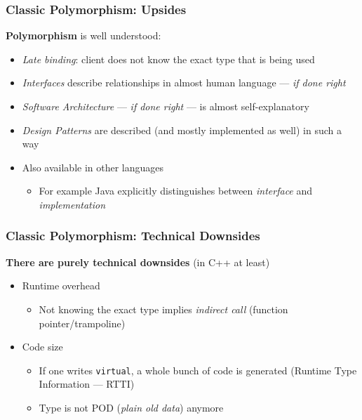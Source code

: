 \begin{frame}
  \frametitle{Classic Polymorphism: Upsides}

  \textbf{Polymorphism} is well understood:

  \begin{itemize}
  \item \textit{Late binding}: client does not know the exact type
    that is being used
  \item \textit{Interfaces} describe relationships in almost human
    language --- \textit{if done right}
  \item \textit{Software Architecture} --- \textit{if done right} ---
    is almost self-explanatory
  \item \textit{Design Patterns} are described (and mostly implemented
    as well) in such a way
  \item Also available in other languages
    \begin{itemize}
    \item For example Java explicitly distinguishes between
      \textit{interface} and \textit{implementation}
    \end{itemize}
  \end{itemize}
  
\end{frame}

\begin{frame}
  \frametitle{Classic Polymorphism: Technical Downsides}

  \textbf{There are purely technical downsides} (in C++ at least)

  \begin{itemize}
  \item Runtime overhead
    \begin{itemize}
    \item Not knowing the exact type implies \textit{indirect call}
      (function pointer/trampoline)
    \end{itemize}
  \item Code size
    \begin{itemize}
    \item If one writes \texttt{virtual}, a whole bunch of code is
      generated (Runtime Type Information --- RTTI)
    \item Type is not POD (\textit{plain old data}) anymore
    \end{itemize}
  \end{itemize}
  
\end{frame}

